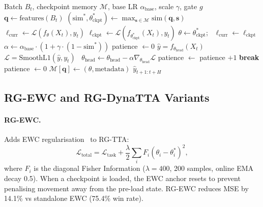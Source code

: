 \documentclass[journal]{IEEEtran}
\begin{document}
\begin{algorithm}[t]
\caption{RG-TTA: Regime-Guided Test-Time Adaptation}
\label{alg:rgtta}
\begin{algorithmic}[1]
\REQUIRE Batch $B_t$, checkpoint memory $\mathcal{M}$, base LR $\alpha_{\text{base}}$, scale $\gamma$, gate $g$
\STATE $\mathbf{q} \leftarrow \text{features}(B_t)$ \hfill {}
\STATE $(\text{sim}^*, \theta^*_{\text{ckpt}}) \leftarrow \max_{\mathbf{s} \in \mathcal{M}} \text{sim}(\mathbf{q}, \mathbf{s})$ \hfill {}
\STATE $\ell_{\text{curr}} \leftarrow \mathcal{L}(f_\theta(X_t), y_t)$
  \STATE $\ell_{\text{ckpt}} \leftarrow \mathcal{L}(f_{\theta^*_{\text{ckpt}}}(X_t), y_t)$
    \STATE $\theta \leftarrow \theta^*_{\text{ckpt}}$; \, $\ell_{\text{curr}} \leftarrow \ell_{\text{ckpt}}$
  \ENDIF
\ENDIF
\STATE $\alpha \leftarrow \alpha_{\text{base}} \cdot (1 + \gamma \cdot (1 - \text{sim}^*))$ \hfill {}
\STATE patience $\leftarrow 0$
  \STATE $\hat{y} = f_{\theta_{\text{head}}}(X_t)$ \hfill {}
  \STATE $\mathcal{L} = \text{SmoothL1}(\hat{y}, y_t)$~\cite{huber1964robust} \hfill {}
  \STATE $\theta_{\text{head}} \leftarrow \theta_{\text{head}} - \alpha \nabla_{\theta_{\text{head}}} \mathcal{L}$
    \STATE patience $\leftarrow$ patience $+ 1$
     \STATE \textbf{break} \ENDIF
  \ELSE
    \STATE patience $\leftarrow 0$
  \ENDIF
\ENDFOR
\STATE $\mathcal{M}[\mathbf{q}] \leftarrow (\theta, \text{metadata})$ \hfill {}
\RETURN $\hat{y}_{t+1:t+H}$
\end{algorithmic}
\end{algorithm}

\subsection{RG-EWC and RG-DynaTTA Variants}
\label{sec:variants}

\paragraph{RG-EWC.} Adds EWC regularisation~\cite{kirkpatrick2017ewc} to RG-TTA:
\begin{equation}
  \mathcal{L}_{\text{total}} = \mathcal{L}_{\text{task}} + \frac{\lambda}{2} \sum_i F_i (\theta_i - \theta^*_i)^2,
  \label{eq:ewc}
\end{equation}
where $F_i$ is the diagonal Fisher Information ($\lambda = 400$, 200 samples, online EMA decay 0.5). When a checkpoint is loaded, the EWC anchor resets to prevent penalising movement away from the pre-load state. RG-EWC reduces MSE by 14.1\% vs standalone EWC (75.4\% win rate).
\end{document}

